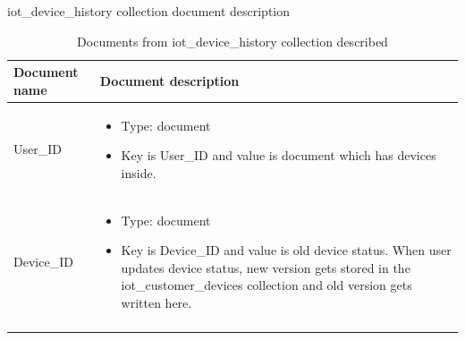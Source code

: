 iot{\_}device{\_}history collection document description
\begin{center}
\begin{longtable}{ |m{4cm}|m{9cm}| } 
 \hline
 Document name & Document description \\ 
 \hline
   User{\_}ID &  
  \begin{itemize}
    \item Type: document
    \item Key is User{\_}ID and value is document which has devices inside.
  \end{itemize} \\
  \hline
   Device{\_}ID &  
  \begin{itemize}
    \item Type: document
    \item Key is Device{\_}ID and value is old device status. When user updates device status, new version gets stored in the iot{\_}customer{\_}devices collection and old version gets written here.
  \end{itemize} \\
 \hline
\caption{Documents from iot{\_}device{\_}history collection described}
\end{longtable}
\end{center}

